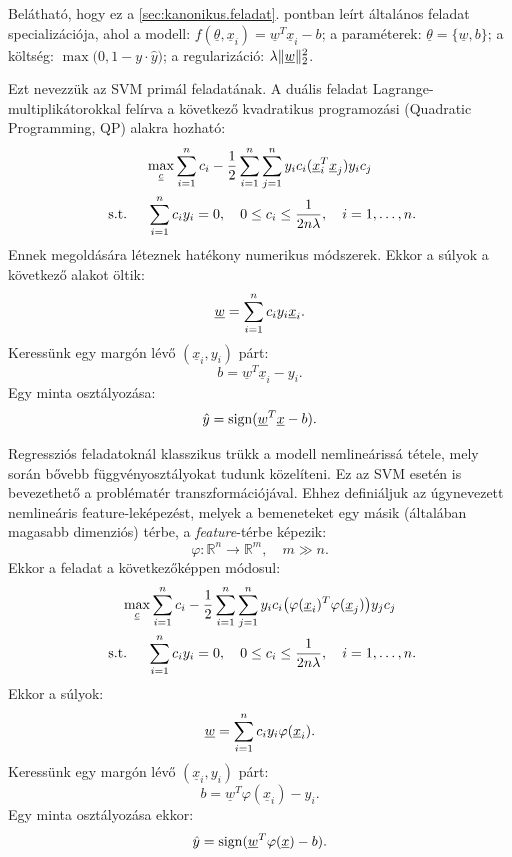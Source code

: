 Belátható, hogy ez a \ref{sec:kanonikus.feladat}. pontban leírt általános feladat specializációja, ahol a modell: $ f(\underline{\theta}, \underline{x}_i) = \underline{w}^T \underline{x}_i - b $; a paraméterek: $ \underline{\theta} = \{\underline{w}, b\} $; a költség: $ \max\big(0, 1 - y \cdot\hat{y}) $; a regularizáció: $ \lambda \lVert\underline{w}\rVert_2^2 $.


Ezt nevezzük az SVM primál feladatának. A duális feladat Lagrange-multiplikátorokkal felírva a következő kvadratikus programozási (Quadratic Programming, QP) alakra hozható:
\begin{multline*}
\max\limits_{\underline{c}} \sum\limits_{i=1}^{n}c_i -  
\frac{1}{2}\sum\limits_{{i}=1}^{n}\sum\limits_{{j}=1}^{n} y_i c_i (\underline{x}_i^T \underline{x}_j) y_i c_j \\
\text{ s.t. } \quad 
\sum\limits_{{i}=1}^{n} c_i y_i = 0, \quad
0 \leq c_i \leq \frac{1}{2n\lambda}, \quad 
i=1,\dots,n.
\end{multline*}
Ennek megoldására léteznek hatékony numerikus módszerek.
Ekkor a súlyok a következő alakot öltik:
\[
\underline{w} = \sum\limits_{{i}=1}^{n} c_i y_i \underline{x}_i.
\]
Keressünk egy margón lévő $ (\underline{x}_i, y_i) $ párt:
\[
b = \underline{w}^T \underline{x}_i  - y_i.
\]
Egy minta osztályozása:
\[
\hat{y} = \operatorname{sign}(\underline{w}^T \underline{x} - b).
\]






Regressziós feladatoknál klasszikus trükk a modell nemlineárissá tétele, mely során bővebb függvényosztályokat tudunk közelíteni. Ez az SVM esetén is bevezethető a problématér 
transzformációjával.
Ehhez definiáljuk az úgynevezett nemlineáris feature-leképezést, melyek a bemeneteket egy másik (általában magasabb dimenziós) térbe,
a \textit{feature}-térbe képezik:
\[
\varphi\colon \mathbb{R}^n \rightarrow \mathbb{R}^m, \quad m \gg n.
\]
Ekkor a feladat a következőképpen módosul:
\begin{multline*}
\max\limits_{\underline{c}} \sum\limits_{i=1}^{n}c_i - 
\frac{1}{2}\sum\limits_{{i}=1}^{n}\sum\limits_{{j}=1}^{n} y_i c_i \big(\varphi(\underline{x}_i)^T \varphi(\underline{x}_j)\big) y_j c_j \\
\text{ s.t. } \quad 
\sum\limits_{{i}=1}^{n} c_i y_i = 0, \quad
0 \leq c_i \leq \frac{1}{2n\lambda}, \quad 
i=1,\dots,n.
\end{multline*}
Ekkor a súlyok:
\[
\underline{w} = \sum\limits_{{i}=1}^{n} c_i y_i \varphi(\underline{x}_i).
\]
Keressünk egy margón lévő $ (\underline{x}_i, y_i) $ párt:
\[
b = \underline{w}^T \varphi(\underline{x}_i)  - y_i.
\]
Egy minta osztályozása ekkor:
\[
\hat{y} = \operatorname{sign}(\underline{w}^T \varphi(\underline{x}) - b).
\]



